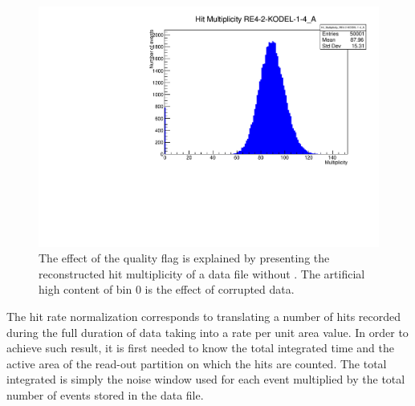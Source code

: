 	\begin{figure}[H]
        \centering
		\includegraphics[width = 0.7\linewidth]{fig/app1/No_Qflag_nhits_KODEL.pdf}
		\caption{\label{fig:corrupted} The effect of the quality flag is explained by presenting the reconstructed hit multiplicity of a data file without . The artificial high content of bin 0 is the effect of corrupted data.}
	\end{figure}
		
	The hit rate normalization corresponds to translating a number of hits recorded during the full duration of data taking into a rate per unit area value. In order to achieve such result, it is first needed to know the total integrated time and the active area of the read-out partition on which the hits are counted. The total integrated is simply the noise window used for each event multiplied by the total number of events stored in the data file.\\
	

